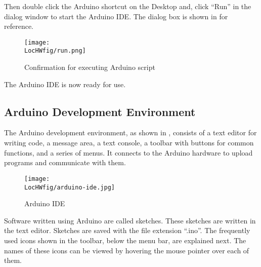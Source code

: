 \begin{enumerate}
\end{enumerate}
Then double click the Arduino shortcut on the Desktop and, click ``Run''
in the dialog window to start the Arduino IDE. The dialog box is shown in  for reference.
\begin{figure}
      \centering
      \texttt{[image: \\LocHWfig/run.png]}
      \caption{Confirmation for executing Arduino script}
      \label{ard-lin-run}
\end{figure}
The Arduino IDE is now ready for use.

\subsection{Arduino Development Environment}
\label{sec:Arduino-IDE}
The Arduino development environment, as shown in ,
consists of 
a text editor for writing code, a message area, a text console, a
toolbar with buttons for common functions, and a series of menus. It
connects to the Arduino hardware to upload programs and communicate
with them.

\begin{figure}
      \centering
      \texttt{[image: \\LocHWfig/arduino-ide.jpg]}
      \caption{Arduino IDE}
      \label{ard-ide}
\end{figure}
Software written using Arduino are called sketches. These sketches are
written in the text editor. Sketches are saved with the file extension
``.ino''. The frequently used icons shown in the toolbar, below the menu bar, are explained next. The names of these icons can be viewed by hovering the mouse pointer over each of them.


